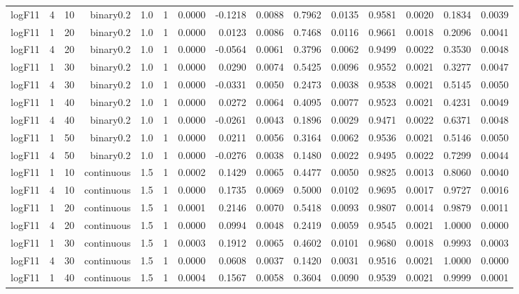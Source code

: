 \begin{longtable}{rrrrrrrrrrrrrrr}
  logF11 & 4 & 10 & binary0.2 & 1.0 & 1 & 0.0000 & -0.1218 & 0.0088 & 0.7962 & 0.0135 & 0.9581 & 0.0020 & 0.1834 & 0.0039 \\ 
  logF11 & 1 & 20 & binary0.2 & 1.0 & 1 & 0.0000 & 0.0123 & 0.0086 & 0.7468 & 0.0116 & 0.9661 & 0.0018 & 0.2096 & 0.0041 \\ 
  logF11 & 4 & 20 & binary0.2 & 1.0 & 1 & 0.0000 & -0.0564 & 0.0061 & 0.3796 & 0.0062 & 0.9499 & 0.0022 & 0.3530 & 0.0048 \\ 
  logF11 & 1 & 30 & binary0.2 & 1.0 & 1 & 0.0000 & 0.0290 & 0.0074 & 0.5425 & 0.0096 & 0.9552 & 0.0021 & 0.3277 & 0.0047 \\ 
  logF11 & 4 & 30 & binary0.2 & 1.0 & 1 & 0.0000 & -0.0331 & 0.0050 & 0.2473 & 0.0038 & 0.9538 & 0.0021 & 0.5145 & 0.0050 \\ 
  logF11 & 1 & 40 & binary0.2 & 1.0 & 1 & 0.0000 & 0.0272 & 0.0064 & 0.4095 & 0.0077 & 0.9523 & 0.0021 & 0.4231 & 0.0049 \\ 
  logF11 & 4 & 40 & binary0.2 & 1.0 & 1 & 0.0000 & -0.0261 & 0.0043 & 0.1896 & 0.0029 & 0.9471 & 0.0022 & 0.6371 & 0.0048 \\ 
  logF11 & 1 & 50 & binary0.2 & 1.0 & 1 & 0.0000 & 0.0211 & 0.0056 & 0.3164 & 0.0062 & 0.9536 & 0.0021 & 0.5146 & 0.0050 \\ 
  logF11 & 4 & 50 & binary0.2 & 1.0 & 1 & 0.0000 & -0.0276 & 0.0038 & 0.1480 & 0.0022 & 0.9495 & 0.0022 & 0.7299 & 0.0044 \\ 
  logF11 & 1 & 10 & continuous & 1.5 & 1 & 0.0002 & 0.1429 & 0.0065 & 0.4477 & 0.0050 & 0.9825 & 0.0013 & 0.8060 & 0.0040 \\ 
  logF11 & 4 & 10 & continuous & 1.5 & 1 & 0.0000 & 0.1735 & 0.0069 & 0.5000 & 0.0102 & 0.9695 & 0.0017 & 0.9727 & 0.0016 \\ 
  logF11 & 1 & 20 & continuous & 1.5 & 1 & 0.0001 & 0.2146 & 0.0070 & 0.5418 & 0.0093 & 0.9807 & 0.0014 & 0.9879 & 0.0011 \\ 
  logF11 & 4 & 20 & continuous & 1.5 & 1 & 0.0000 & 0.0994 & 0.0048 & 0.2419 & 0.0059 & 0.9545 & 0.0021 & 1.0000 & 0.0000 \\ 
  logF11 & 1 & 30 & continuous & 1.5 & 1 & 0.0003 & 0.1912 & 0.0065 & 0.4602 & 0.0101 & 0.9680 & 0.0018 & 0.9993 & 0.0003 \\ 
  logF11 & 4 & 30 & continuous & 1.5 & 1 & 0.0000 & 0.0608 & 0.0037 & 0.1420 & 0.0031 & 0.9516 & 0.0021 & 1.0000 & 0.0000 \\ 
  logF11 & 1 & 40 & continuous & 1.5 & 1 & 0.0004 & 0.1567 & 0.0058 & 0.3604 & 0.0090 & 0.9539 & 0.0021 & 0.9999 & 0.0001 \\ 

\end{longtable}
